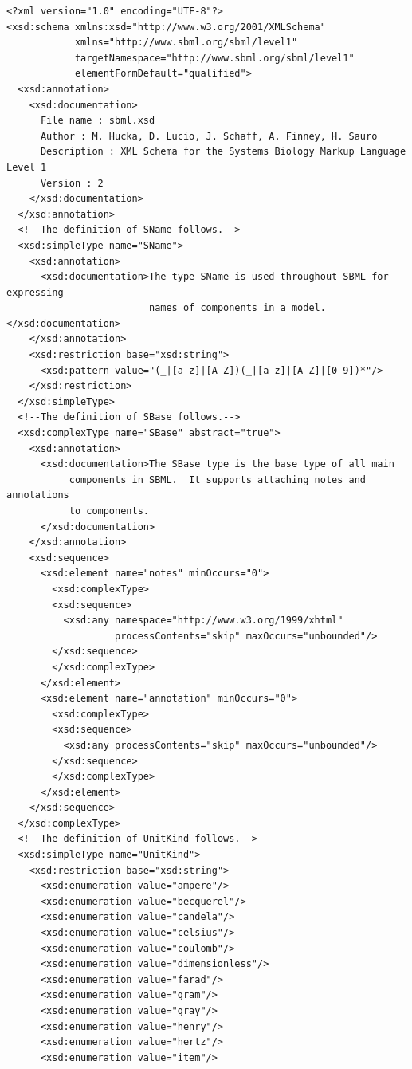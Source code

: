 \documentclass[10pt]{cekarticle}
\begin{document}
\begin{small}
\tightspacing
\begin{verbatim}
<?xml version="1.0" encoding="UTF-8"?>
<xsd:schema xmlns:xsd="http://www.w3.org/2001/XMLSchema"
            xmlns="http://www.sbml.org/sbml/level1"
            targetNamespace="http://www.sbml.org/sbml/level1"
            elementFormDefault="qualified">
  <xsd:annotation>
    <xsd:documentation>
      File name : sbml.xsd
      Author : M. Hucka, D. Lucio, J. Schaff, A. Finney, H. Sauro
      Description : XML Schema for the Systems Biology Markup Language Level 1
      Version : 2
    </xsd:documentation>
  </xsd:annotation>
  <!--The definition of SName follows.-->
  <xsd:simpleType name="SName">
    <xsd:annotation>
      <xsd:documentation>The type SName is used throughout SBML for expressing 
                         names of components in a model.</xsd:documentation>
    </xsd:annotation>
    <xsd:restriction base="xsd:string">
      <xsd:pattern value="(_|[a-z]|[A-Z])(_|[a-z]|[A-Z]|[0-9])*"/>
    </xsd:restriction>
  </xsd:simpleType>
  <!--The definition of SBase follows.-->
  <xsd:complexType name="SBase" abstract="true">
    <xsd:annotation>
      <xsd:documentation>The SBase type is the base type of all main
           components in SBML.  It supports attaching notes and annotations
           to components.
      </xsd:documentation>
    </xsd:annotation>
    <xsd:sequence>
      <xsd:element name="notes" minOccurs="0">
      	<xsd:complexType>
        <xsd:sequence>
          <xsd:any namespace="http://www.w3.org/1999/xhtml"
                   processContents="skip" maxOccurs="unbounded"/>
        </xsd:sequence>
      	</xsd:complexType>
      </xsd:element>
      <xsd:element name="annotation" minOccurs="0">
      	<xsd:complexType>
        <xsd:sequence>
          <xsd:any processContents="skip" maxOccurs="unbounded"/>
        </xsd:sequence>
      	</xsd:complexType>
      </xsd:element>
    </xsd:sequence>
  </xsd:complexType>
  <!--The definition of UnitKind follows.-->
  <xsd:simpleType name="UnitKind">
    <xsd:restriction base="xsd:string">
      <xsd:enumeration value="ampere"/>
      <xsd:enumeration value="becquerel"/>
      <xsd:enumeration value="candela"/>
      <xsd:enumeration value="celsius"/>
      <xsd:enumeration value="coulomb"/>
      <xsd:enumeration value="dimensionless"/>
      <xsd:enumeration value="farad"/>
      <xsd:enumeration value="gram"/>
      <xsd:enumeration value="gray"/>
      <xsd:enumeration value="henry"/>
      <xsd:enumeration value="hertz"/>
      <xsd:enumeration value="item"/>

\end{verbatim}
\end{small}
\end{document}
